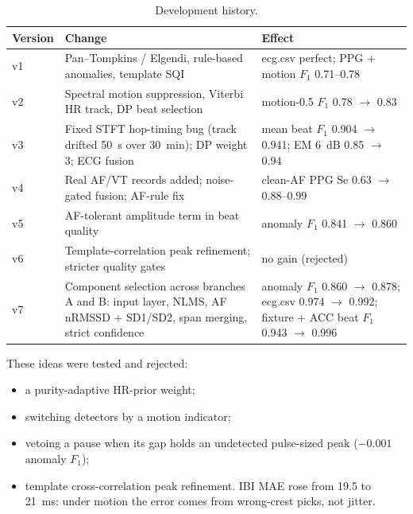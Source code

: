 \documentclass[10pt,a4paper]{article}
\begin{document}
\begin{table}[h]
\centering\small
\caption{Development history.}
\label{tab:history}
\begin{tabularx}{\linewidth}{@{}lXX@{}}
\toprule
Version & Change & Effect\\
\midrule
v1 & Pan--Tompkins / Elgendi, rule-based anomalies, template SQI & ecg.csv perfect; PPG + motion $F_1$ 0.71--0.78\\
v2 & Spectral motion suppression, Viterbi HR track, DP beat selection & motion-0.5 $F_1$ 0.78 $\to$ 0.83\\
v3 & Fixed STFT hop-timing bug (track drifted \SI{50}{s} over \SI{30}{min}); DP weight 3; ECG fusion
   & mean beat $F_1$ 0.904 $\to$ 0.941; EM \SI{6}{dB} 0.85 $\to$ 0.94\\
v4 & Real AF/VT records added; noise-gated fusion; AF-rule fix & clean-AF PPG Se 0.63 $\to$ 0.88--0.99\\
v5 & AF-tolerant amplitude term in beat quality & anomaly $F_1$ 0.841 $\to$ 0.860\\
v6 & Template-correlation peak refinement; stricter quality gates & no gain (rejected)\\
v7 & Component selection across branches A and B: input layer, NLMS, AF nRMSSD + SD1/SD2, span merging, strict confidence
   & anomaly $F_1$ 0.860 $\to$ 0.878; ecg.csv 0.974 $\to$ 0.992; fixture + ACC beat $F_1$ 0.943 $\to$ 0.996\\
\bottomrule
\end{tabularx}
\end{table}

These ideas were tested and rejected:
\begin{itemize}
  \item a purity-adaptive HR-prior weight;
  \item switching detectors by a motion indicator;
  \item vetoing a pause when its gap holds an undetected pulse-sized peak ($-0.001$ anomaly $F_1$);
  \item template cross-correlation peak refinement. IBI MAE rose from 19.5 to \SI{21}{ms}: under motion the error comes
        from wrong-crest picks, not jitter.
\end{itemize}

\end{document}
